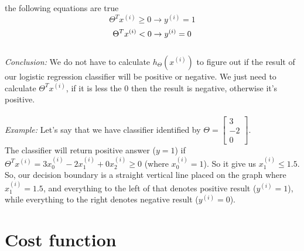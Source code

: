 \documentclass{article} %
\begin{document}
the following equations are true\\
\begin{equation}
\Theta^Tx^{(i)} \geq 0 \rightarrow y^{(i)} = 1
\end{equation}
\begin{equation}
\Theta^Tx^{(i)} < 0 \rightarrow y^{(i)} = 0\\
\end{equation}
\\  
\textit{Conclusion:} We do not have to calculate $h_\Theta(x^{(i)})$ to figure out if the result of our logistic regression classifier will be positive or negative. We just need to calculate $\Theta^Tx^{(i)}$, if it is less the $0$ then the result is negative, otherwise it's positive.\\
\\
\textit{Example:} Let's say that we have classifier identified by  $\Theta = \begin{bmatrix} 3 \\ -2 \\ 0\end{bmatrix} $.\\
The classifier will return positive answer ($y=1$) if $\Theta^Tx^{(i)} = 3x^{(i)}_0 - 2x^{(i)}_1 + 0x^{(i)}_2 \geq 0$ (where $x^{(i)}_0 = 1$).
So it give us $x^{(i)}_1 \leq 1.5$. So, our decision boundary is a straight vertical line placed on the graph where $x^{(i)}_1=1.5$, 
and everything to the left of that denotes positive result ($y^{(i)} = 1$), while everything to the right denotes negative result ($y^{(i)} = 0$).
\begin{center}
\end{center}



\section{Cost function}
\end{document}
